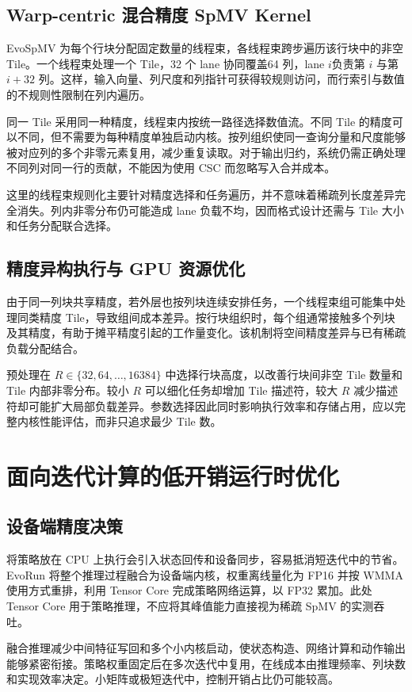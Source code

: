 \subsection{Warp-centric 混合精度 SpMV Kernel}
EvoSpMV 为每个行块分配固定数量的线程束，各线程束跨步遍历该行块中的非空 Tile。一个线程束处理一个 Tile，32 个 lane 协同覆盖64 列，lane $i$负责第 $i$ 与第 $i+32$ 列。这样，输入向量、列尺度和列指针可获得较规则访问，而行索引与数值的不规则性限制在列内遍历。

同一 Tile 采用同一种精度，线程束内按统一路径选择数值流。不同 Tile 的精度可以不同，但不需要为每种精度单独启动内核。按列组织使同一查询分量和尺度能够被对应列的多个非零元素复用，减少重复读取。对于输出归约，系统仍需正确处理不同列对同一行的贡献，不能因为使用 CSC 而忽略写入合并成本。

这里的线程束规则化主要针对精度选择和任务遍历，并不意味着稀疏列长度差异完全消失。列内非零分布仍可能造成 lane 负载不均，因而格式设计还需与 Tile 大小和任务分配联合选择。

\subsection{精度异构执行与 GPU 资源优化}
由于同一列块共享精度，若外层也按列块连续安排任务，一个线程束组可能集中处理同类精度 Tile，导致组间成本差异。按行块组织时，每个组通常接触多个列块及其精度，有助于摊平精度引起的工作量变化。该机制将空间精度差异与已有稀疏负载分配结合。

预处理在 $R\in\{32,64,\ldots,16384\}$ 中选择行块高度，以改善行块间非空 Tile 数量和 Tile 内部非零分布。较小 $R$ 可以细化任务却增加 Tile 描述符，较大 $R$ 减少描述符却可能扩大局部负载差异。参数选择因此同时影响执行效率和存储占用，应以完整内核性能评估，而非只追求最少 Tile 数。

\section{面向迭代计算的低开销运行时优化}
\subsection{设备端精度决策}
将策略放在 CPU 上执行会引入状态回传和设备同步，容易抵消短迭代中的节省。EvoRun 将整个推理过程融合为设备端内核，权重离线量化为 FP16 并按 WMMA 使用方式重排，利用 Tensor Core 完成策略网络运算，以 FP32 累加。此处 Tensor Core 用于策略推理，不应将其峰值能力直接视为稀疏 SpMV 的实测吞吐。

融合推理减少中间特征写回和多个小内核启动，使状态构造、网络计算和动作输出能够紧密衔接。策略权重固定后在多次迭代中复用，在线成本由推理频率、列块数和实现效率决定。小矩阵或极短迭代中，控制开销占比仍可能较高。

